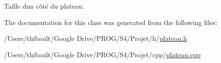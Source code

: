Taille d\textquotesingle{}un côté du plateau. 



The documentation for this class was generated from the following files\+:\begin{DoxyCompactItemize}
\item 
/\+Users/thibault/\+Google Drive/\+P\+R\+O\+G/\+S4/\+Projet/h/\hyperlink{plateau_8h}{plateau.\+h}\item 
/\+Users/thibault/\+Google Drive/\+P\+R\+O\+G/\+S4/\+Projet/cpp/\hyperlink{plateau_8cpp}{plateau.\+cpp}\end{DoxyCompactItemize}
